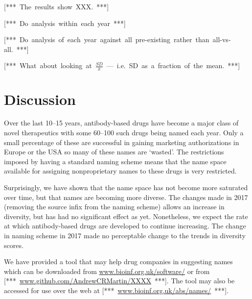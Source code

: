 \documentclass{article}
\newcommand{\note}[1]{\mbox{\color{red}[*** #1 ***]}}
\begin{document}
\note{The results show XXX.}

\note{Do analysis within each year}

\note{Do analysis of each year against all pre-existing rather than
  all-vs-all.}

\note{What about looking at $\frac{SD}{\bar{x}}$ --- i.e. SD as a
  fraction of the mean.} 

\section{Discussion}
Over the last 10--15 years, antibody-based drugs have become a major
class of novel therapeutics with some 60--100 such drugs being named
each year. Only a small percentage of these are successful in gaining
marketing authorizations in Europe or the USA so many of these names
are `wasted'. The restrictions imposed by having a standard naming
scheme means that the name space available for assigning
nonproprietary names to these drugs is very restricted.

Surprisingly, we have shown that the name space has not become more
saturated over time, but that names are becoming more diverse.  The
changes made in 2017 (removing the source infix from the naming
scheme) allows an increase in diversity, but has had no significant
effect as yet. Nonetheless, we expect the rate at which antibody-based
drugs are developed to continue increasing. The change in naming
scheme in 2017 made no perceptable change to the trends in diversity
scores.

We have provided a tool that may help drug companies in suggesting
names which can be downloaded from \url{www.bioinf.org.uk/software/}
or from \note{\url{www.github.com/AndrewCRMartin/XXXX}}. The tool may also be
accessed for use over the web at \note{\url{www.bioinf.org.uk/abs/names/}}.



\end{document}
